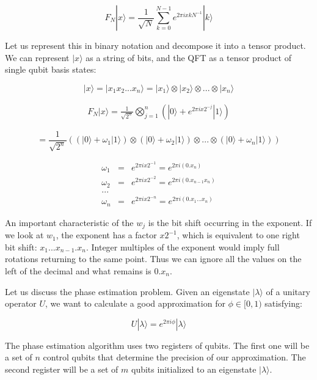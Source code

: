 \documentclass[msc,oneside]{ubcthesis}
\begin{document}
	$$ F_N |x \rangle = \frac{1}{\sqrt{N}} \sum_{k=0}^{N-1} e^{2\pi i x k N^{-1}} |k\rangle $$
	
	Let us represent this in binary notation and decompose it into a tensor product. We can represent $|x\rangle$ as a string of bits, and the QFT as a tensor product of single qubit basis states:
	
	$$|x\rangle = |x_1x_2 ... x_n\rangle =  |x_1\rangle \otimes |x_2\rangle \otimes ... \otimes |x_n\rangle$$
	
	\begin{eqnarray}\label{phase-equation}
		F_N |x \rangle = \frac{1}{\sqrt{2^n}} \bigotimes_{j=1}^n (|0\rangle +  e^{2\pi i x  2^{-j}} |1\rangle)
	\end{eqnarray}
	
	$$= \frac{1}{\sqrt{2^n}} ((|0\rangle + \omega_1|1\rangle)  \otimes(|0\rangle + \omega_2|1\rangle)\otimes ... \otimes(|0\rangle + \omega_n|1\rangle))$$
	
	
	\begin{eqnarray*}
		\omega_1 &=& e^{2\pi i x 2^{-1}} =  e^{2\pi i (0.x_n)}\\
		\omega_2 &=& e^{2\pi i x 2^{-2}} =  e^{2\pi i (0.x_{n-1}x_n)}\\
		...\\
		\omega_n &=& e^{2\pi i x 2^{-n}} =  e^{2\pi i (0.x_1...x_n)}
	\end{eqnarray*}
	
	
	An important characteristic of the $w_j$ is the bit shift occurring in the exponent. If we look at $w_1$, the exponent has a factor $x 2^{-1}$, which is equivalent to one right bit shift: $x_1...x_{n-1}.x_n$. Integer multiples of the exponent would imply full rotations returning to the same point. Thus we can ignore all the values on the left of the decimal and what remains is $0.x_n$. 
	
	
	
	Let us discuss the phase estimation problem. Given an eigenstate $|\lambda \rangle$ of a unitary operator $U$, we want to calculate a good approximation  for $\phi \in [0,1)$ satisfying:
	
	\begin{equation}
		U |\lambda \rangle = e^{2\pi i \phi} |\lambda \rangle
	\end{equation}
	
	The phase estimation algorithm uses two registers of qubits. The first one will be a set of $n$ control qubits that determine the precision of our approximation. The second register will be a set of $m$ qubits initialized to an eigenstate $|\lambda\rangle$.
	
\end{document}
